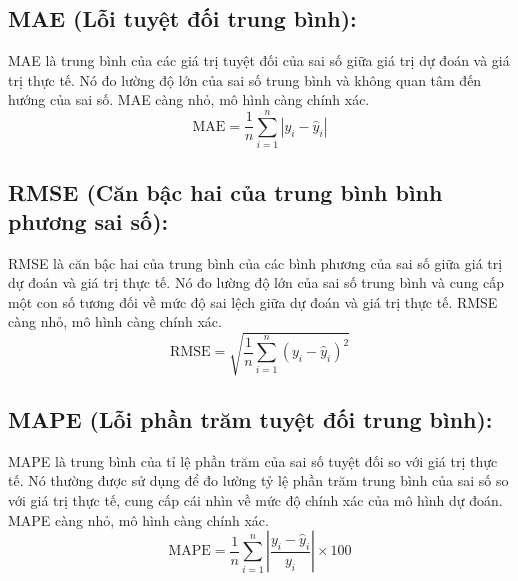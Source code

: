\subsection*{MAE (Lỗi tuyệt đối trung bình):}
MAE là trung bình của các giá trị tuyệt đối của sai số giữa giá trị dự đoán và giá trị thực tế. Nó đo lường độ lớn của sai số trung bình và không quan tâm đến hướng của sai số. MAE càng nhỏ, mô hình càng chính xác.
\begin{equation}
\text{MAE} = \frac{1}{n} \sum_{i=1}^{n} \left| y_i - \hat{y}_i \right|
\end{equation}

\subsection*{RMSE (Căn bậc hai của trung bình bình phương sai số):}
RMSE là căn bậc hai của trung bình của các bình phương của sai số giữa giá trị dự đoán và giá trị thực tế. Nó đo lường độ lớn của sai số trung bình và cung cấp một con số tương đối về mức độ sai lệch giữa dự đoán và giá trị thực tế. RMSE càng nhỏ, mô hình càng chính xác.
\begin{equation}
\text{RMSE} = \sqrt{\frac{1}{n} \sum_{i=1}^{n} (y_i - \hat{y}_i)^2}
\end{equation}

\subsection*{MAPE (Lỗi phần trăm tuyệt đối trung bình):}
MAPE là trung bình của tỉ lệ phần trăm của sai số tuyệt đối so với giá trị thực tế. Nó thường được sử dụng để đo lường tỷ lệ phần trăm trung bình của sai số so với giá trị thực tế, cung cấp cái nhìn về mức độ chính xác của mô hình dự đoán. MAPE càng nhỏ, mô hình càng chính xác.
\begin{equation}
\text{MAPE} = \frac{1}{n} \sum_{i=1}^{n} \left| \frac{y_i - \hat{y}_i}{y_i} \right| \times 100
\end{equation}